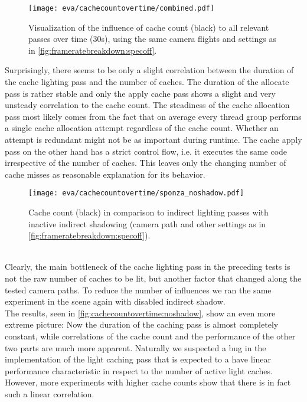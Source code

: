 \documentclass[thesis.tex]{subfiles}
\begin{document}
\begin{figure}
\centering
\texttt{[image: eva/cachecountovertime/combined.pdf]}
\caption{Visualization of the influence of cache count (black) to all relevant passes over time (30s), using the same camera flights and settings as in \autoref{fig:frameratebreakdown:specoff}.}
\label{fig:cachecountovertime}
\end{figure}
Surprisingly, there seems to be only a slight correlation between the duration of the cache lighting pass and the number of caches.
The duration of the allocate pass is rather stable and only the apply cache pass shows a slight and very unsteady correlation to the cache count.
The steadiness of the cache allocation pass most likely comes from the fact that on average every thread group performs a single cache allocation attempt regardless of the cache count.
Whether an attempt is redundant might not be as important during runtime.
The cache apply pass on the other hand has a strict control flow, i.e. it executes the same code irrespective of the number of caches.
This leaves only the changing number of cache misses as reasonable explanation for its behavior.
\\
\begin{figure}[h]
\centering
\texttt{[image: eva/cachecountovertime/sponza\_noshadow.pdf]}
\caption{Cache count (black) in comparison to indirect lighting passes with inactive indirect shadowing (camera path and other settings as in \autoref{fig:frameratebreakdown:specoff}).}
\label{fig:cachecountovertime:noshadow}
\end{figure}
\\
Clearly, the main bottleneck of the cache lighting pass in the preceding tests is not the raw number of caches to be lit, but another factor that changed along the tested camera paths.
To reduce the number of influences we ran the same experiment in the  scene again with disabled indirect shadow.
\\
The results, seen in \autoref{fig:cachecountovertime:noshadow}, show an even more extreme picture:
Now the duration of the caching pass is almost completely constant, while correlations of the cache count and the performance of the other two parts are much more apparent.
Naturally we suspected a bug in the implementation of the light caching pass that is expected to a have linear performance characteristic in respect to the number of active light caches.
However, more experiments with higher cache counts show that there is in fact such a linear correlation.
\end{document}
